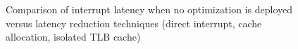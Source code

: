 \begin{figure}[!htb]
\begin{center}
\begin{tikzpicture}
\end{tikzpicture}


\end{center}
\ifreport
\caption{Comparison of interrupt latency when no optimization is deployed versus latency reduction techniques (direct interrupt, cache allocation, isolated TLB cache)}
\fi
\label{plot-allopt}
\end{figure}

